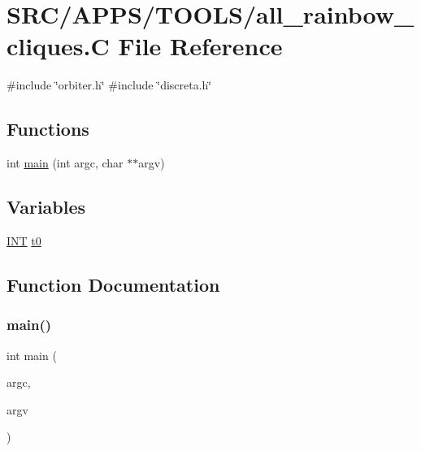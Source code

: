 \hypertarget{all__rainbow__cliques_8_c}{}\section{S\+R\+C/\+A\+P\+P\+S/\+T\+O\+O\+L\+S/all\+\_\+rainbow\+\_\+cliques.C File Reference}
\label{all__rainbow__cliques_8_c}
{\ttfamily \#include \char`\"{}orbiter.\+h\char`\"{}}\newline
{\ttfamily \#include \char`\"{}discreta.\+h\char`\"{}}\newline
\subsection*{Functions}
\begin{DoxyCompactItemize}
\item 
int \mbox{\hyperlink{all__rainbow__cliques_8_c_a3c04138a5bfe5d72780bb7e82a18e627}{main}} (int argc, char $\ast$$\ast$argv)
\end{DoxyCompactItemize}
\subsection*{Variables}
\begin{DoxyCompactItemize}
\item 
\mbox{\hyperlink{galois_8h_a09fddde158a3a20bd2dcadb609de11dc}{I\+NT}} \mbox{\hyperlink{all__rainbow__cliques_8_c_a4268f4fe222ffb119218a0199f5e1904}{t0}}
\end{DoxyCompactItemize}


\subsection{Function Documentation}
\mbox{\label{all__rainbow__cliques_8_c_a3c04138a5bfe5d72780bb7e82a18e627}} 
\subsubsection{\texorpdfstring{main()}{main()}}
{\footnotesize\ttfamily int main (\begin{DoxyParamCaption}\item[{int}]{argc,  }\item[{char $\ast$$\ast$}]{argv }\end{DoxyParamCaption})}



